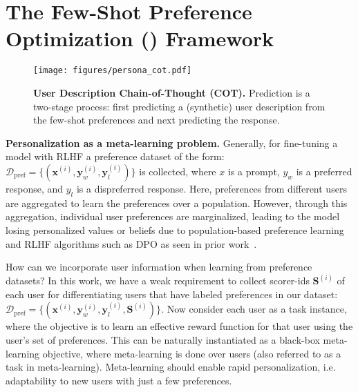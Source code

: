 \vspace{-0.15cm}
\section{The Few-Shot Preference Optimization (\methodname) Framework}
\vspace{-0.15cm}

\begin{figure}
    \centering
    \texttt{[image: figures/persona\_cot.pdf]}
    \caption{\footnotesize\textbf{User Description Chain-of-Thought (COT).} Prediction is a two-stage process: first predicting a (synthetic) user description from the few-shot preferences and next predicting the response.}
    \label{fig:persona_cot}
    \vspace{-0.4cm}
\end{figure}

\textbf{Personalization as a meta-learning problem.} Generally, for fine-tuning a model with RLHF a preference dataset of the form: $\mathcal{D}_{\text{pref}} = \{(\mathbf{x}^{(i)}, \mathbf{y}_w^{(i)}, \mathbf{y}_l^{(i)})\}$ is collected, where $x$ is a prompt, $y_w$ is a preferred response, and $y_l$ is a dispreferred response. Here, preferences from different users are aggregated to learn the preferences over a population. However, through this aggregation, individual user preferences are marginalized, leading to the model losing personalized values or beliefs due to population-based preference learning and RLHF algorithms such as DPO as seen in prior work~\citep{siththaranjan2024distributionalpreferencelearningunderstanding}.

How can we incorporate user information when learning from preference datasets? In this work, we have a weak requirement to collect scorer-ids $\mathbf{S}^{(i)}$ of each user for differentiating users that have labeled preferences in our dataset: $\mathcal{D}_{\text{pref}} = \{(\mathbf{x}^{(i)}, \mathbf{y}_w^{(i)}, \mathbf{y}_l^{(i)}, \mathbf{S}^{(i)})\}$. Now consider each user as a task instance, where the objective is to learn an effective reward function for that user using the user's set of preferences. This can be naturally instantiated as a black-box meta-learning objective, where meta-learning is done over users (also referred to as a task in meta-learning). Meta-learning should enable rapid personalization, i.e. adaptability to new users with just a few preferences.

